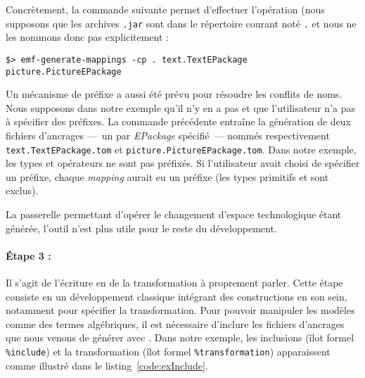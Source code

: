 Concrètement, la commande suivante permet d'effectuer l'opération (nous
supposons que les archives \texttt{.jar} sont dans le répertoire courant noté
\texttt{.} et nous ne les nommons donc pas explicitement :

\begin{verbatim}
$> emf-generate-mappings -cp . text.TextEPackage picture.PictureEPackage
\end{verbatim}

Un mécanisme de préfixe a aussi été prévu pour résoudre les conflits de noms.
Nous supposons dans notre exemple qu'il n'y en a pas et que l'utilisateur n'a
pas à spécifier des préfixes. 
%
%
%
%
La commande précédente entraîne la génération de deux fichiers d'ancrages
---~un par \emph{EPackage} spécifié~--- nommés respectivement
\texttt{text.TextEPackage.tom} et \texttt{picture.PictureEPackage.tom}. %
Dans notre exemple, les types et opérateurs ne sont pas préfixés. Si
l'utilisateur avait choisi de spécifier un préfixe, chaque \emph{mapping}
aurait eu un préfixe (les types primitifs et {\ecore} sont exclus).


La passerelle permettant d'opérer le changement d'espace technologique étant
générée, l'outil {\tomemf} n'est plus utile pour le reste du développement.


\paragraph{Étape 3 :} Il s'agit de l'écriture en {\tomjava} de la
transformation à proprement parler. Cette étape consiste en un développement
{\java} classique intégrant des constructions {\tom} en son sein, notamment
 pour spécifier la transformation. Pour pouvoir manipuler
les modèles comme des termes algébriques, il est nécessaire d'inclure les
fichiers d'ancrages que nous venons de générer avec {\tomemf}. Dans notre
exemple, les inclusions (îlot formel \texttt{\%include}) et la transformation
(îlot formel \texttt{\%transformation}) apparaissent comme illustré dans le
listing~\ref{code:exInclude}.

